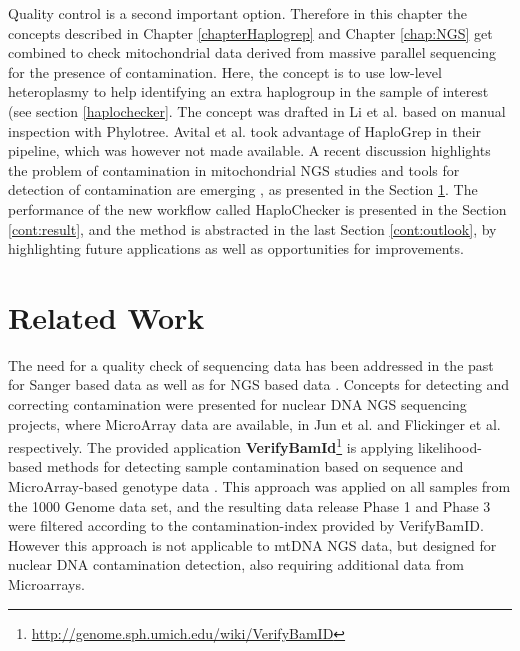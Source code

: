 Quality control is a second important option. Therefore in this chapter the concepts described in Chapter \ref{chapterHaplogrep} and Chapter \ref{chap:NGS} get combined to check mitochondrial data derived from massive parallel sequencing for the presence of contamination. Here, the concept is to use low-level heteroplasmy to help identifying an extra haplogroup in the sample of interest (see section \ref{haplochecker}. The concept was drafted in Li et al. \cite{Li2010} based on manual inspection with Phylotree. Avital et al. \cite{Avital2012} took advantage of HaploGrep in their pipeline, which was however not made available. A recent discussion highlights the problem of contamination in mitochondrial NGS studies \cite{Ye2014,Just2014, Just2015,Ye2014reply} and tools for detection of contamination are emerging \cite{Renaud2015,Jun2012,Dickins2014}, as presented in the Section \ref{cont:relatedwork}. The performance of the new workflow called HaploChecker is presented in the Section \ref{cont:result}, and the method is abstracted in the last Section \ref{cont:outlook}, by highlighting future applications as well as opportunities for improvements.

\section{Related Work}\label{cont:relatedwork}
The need for a quality check of sequencing data has been addressed in the past for Sanger based data \cite{Walker2004, Montesino2007, Bandelt2009, Yao2007} as well as for NGS based data \cite{Holland2011}. 
Concepts for detecting and correcting contamination were presented for nuclear DNA NGS sequencing projects, where MicroArray data are available, in Jun et al. \cite{Jun2012} and Flickinger et al. \cite{Flickinger2015} respectively. The provided application \textbf{VerifyBamId}\footnote{\url{http://genome.sph.umich.edu/wiki/VerifyBamID}} is applying likelihood-based methods for detecting sample contamination based on sequence and MicroArray-based genotype data \cite{Jun2012}. This approach was applied on all samples from the 1000 Genome data set, and the resulting data release Phase 1 and Phase 3 were filtered according to the contamination-index provided by VerifyBamID. However this approach is not applicable to mtDNA NGS data, but designed for nuclear DNA contamination detection, also requiring additional data from Microarrays.

